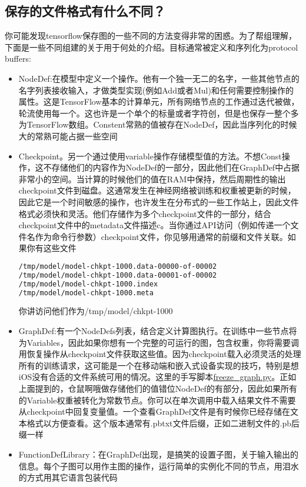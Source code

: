 \subsection{保存的文件格式有什么不同？}
你可能发现tensorflow保存图的一些不同的方法变得非常的困惑。为了帮组理解，下面是一些不同组建的关于用于何处的介绍。目标通常被定义和序列化为protocol buffers:
\begin{itemize}
\item NodeDef:在模型中定义一个操作。他有一个独一无二的名字，一些其他节点的名字列表接收输入，才做类型实现(例如Add或者Mul)和任何需要控制操作的属性。这是TensorFlow基本的计算单元，所有网络节点的工作通过迭代被做，轮流使用每一个。这也许是一个单个的标量或者字符创，但是也保存一整个多为TensorFlow数组。Constent常熟的值被存在NodeDef，因此当序列化的时候大的常熟可能占据一些空间
\item Checkpoint。另一个通过使用variable操作存储模型值的方法。不想Const操作，这不存储他们的内容作为NodeDef的一部分，因此他们在GraphDef中占据非常小的空间。当计算的时候他们的值在RAM中保持，然后周期性的输出checkpoint文件到磁盘。这通常发生在神经网络被训练和权重被更新的时候，因此它是一个时间敏感的操作，也许发生在分布式的一些工作站上，因此文件格式必须快和灵活。他们存储作为多个checkpoint文件的一部分，结合checkpoint文件中的metadata文件描述c。当你通过API访问（例如传递一个文件名作为命令行参数）checkpoint文件，你见够用通常的前缀和文件关联。如果你有这些文件
\begin{lstlisting}[language=Bash]
/tmp/model/model-chkpt-1000.data-00000-of-00002
/tmp/model/model-chkpt-1000.data-00001-of-00002
/tmp/model/model-chkpt-1000.index
/tmp/model/model-chkpt-1000.meta
\end{lstlisting}
你讲访问他们作为/tmp/model/chkpt-1000
\item GraphDef:有一个NodeDefs列表，结合定义计算图执行。在训练中一些节点将为Variables，因此如果你想有一个完整的可运行的图，包含权重，你将需要调用恢复操作从checkpoint文件获取这些值。因为checkpoint载入必须灵活的处理所有的训练请求，这可能是一个在移动端和嵌入式设备实现的技巧，特别是想iOS没有合适的文件系统可用的情况。这里的手写脚本\href{https://www.github.com/tensorflow/tensorflow/blob/r1.4/tensorflow/python/tools/freeze_graph.py}{freeze\_graph.py}。正如上面提到的，仓鼠啊哦做存储他们的值错位NodeDef的有部分，因此如果所有的Variable权重被转化为常数节点。你可以在单次调用中载入结果文件不需要从checkpoint中回复变量值。一个查看GraphDef文件是有时候你已经存储在文本格式以方便查看。这个版本通常有.pbtxt文件后缀，正如二进制文件的.pb后缀一样
\item FunctionDefLibrary：在GraphDef出现，是搞笑的设置子图，关于输入输出的信息。每个子图可以用作主图的操作，运行简单的实例化不同的节点，用泪水的方式用其它语言包装代码

\end{itemize}

